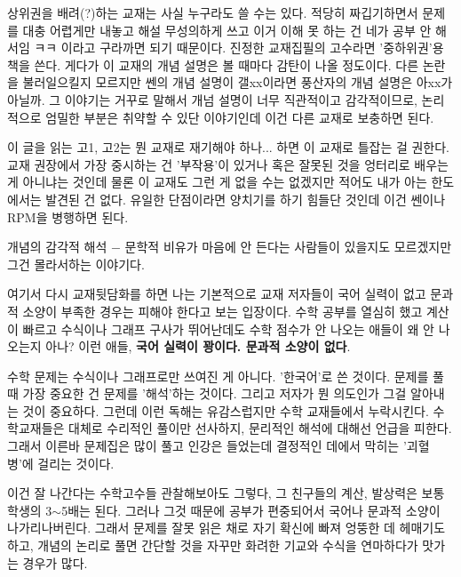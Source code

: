 상위권을 배려(?)하는 교재는 사실 누구라도 쓸 수는 있다. 적당히 짜깁기하면서 문제를 대충 어렵게만 내놓고 해설 무성의하게 쓰고
이거 이해 못 하는 건 네가 공부 안 해서임 ㅋㅋ 이라고 구라까면 되기 때문이다.
진정한 교재집필의 고수라면 '중하위권'용 책을 쓴다.
게다가 이 교재의 개념 설명은 볼 때마다 감탄이 나올 정도이다.
다른 논란을 불러일으킬지 모르지만 쎈의 개념 설명이 갤xx이라면 풍산자의 개념 설명은 아xx가 아닐까.
그 이야기는 거꾸로 말해서 개넘 설명이 너무 직관적이고 감각적이므로, 논리적으로 엄밀한 부분은 취약할 수 있단 이야기인데
이건 다른 교재로 보충하면 된다.
\vspace{5mm}

이 글을 읽는 고1, 고2는 뭔 교재로 재기해야 하나... 하면 이 교재로 틀잡는 걸 권한다.
교재 권장에서 가장 중시하는 건 '부작용'이 있거나 혹은 잘못된 것을 엉터리로 배우는 게 아니냐는 것인데
물론 이 교재도 그런 게 없을 수는 없겠지만 적어도 내가 아는 한도에서는 발견된 건 없다.
유일한 단점이라면 양치기를 하기 힘들단 것인데 이건 쎈이나 RPM을 병행하면 된다.
\vspace{5mm}

개념의 감각적 해석 $-$ 문학적 비유가 마음에 안 든다는 사람들이 있을지도 모르겠지만 그건 몰라서하는 이야기다.
\vspace{5mm}

여기서 다시 교재뒷담화를 하면 나는 기본적으로 교재 저자들이 국어 실력이 없고 문과적 소양이 부족한 경우는 피해야 한다고 보는 입장이다.
수학 공부를 열심히 했고 계산이 빠르고 수식이나 그래프 구사가 뛰어난데도 수학 점수가 안 나오는 애들이 왜 안 나오는지 아나?
이런 애들, \textbf{국어 실력이 꽝이다. 문과적 소양이 없다}.
\vspace{5mm}

수학 문제는 수식이나 그래프로만 쓰여진 게 아니다. '한국어'로 쓴 것이다.
문제를 풀 때 가장 중요한 건 문제를 '해석'하는 것이다. 그리고 저자가 뭔 의도인가 그걸 알아내는 것이 중요하다.
그런데 이런 독해는 유감스럽지만 수학 교재들에서 누락시킨다.
수학교재들은 대체로 수리적인 풀이만 선사하지, 문리적인 해석에 대해선 언급을 피한다.
그래서 이른바 문제집은 많이 풀고 인강은 들었는데 결정적인 데에서 막히는 '괴혈병'에 걸리는 것이다.
\vspace{5mm}

이건 잘 나간다는 수학고수들 관찰해보아도 그렇다, 그 친구들의 계산, 발상력은 보통 학생의 3$\sim$5배는 된다.
그러나 그것 때문에 공부가 편중되어서 국어나 문과적 소양이 나가리나버린다.
그래서 문제를 잘못 읽은 채로 자기 확신에 빠져 엉뚱한 데 헤매기도 하고,
개념의 논리로 풀면 간단할 것을 자꾸만 화려한 기교와 수식을 연마하다가 맛가는 경우가 많다.
\vspace{5mm}

